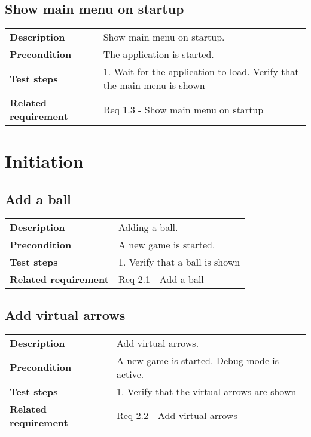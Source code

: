 \documentclass[a4paper,titlepage]{article}
\begin{document}
\subsection{Show main menu on startup}
\begin{tabularx}{\textwidth}{lX}
	\textbf{Description}	&
		Show main menu on startup.\\
	\textbf{Precondition}	&
		The application is started.\\
	\textbf{Test steps}	&
		1. Wait for the application to load\newline
		2. Verify that the main menu is shown\\
	\textbf{Related requirement}	&
		Req 1.3 - Show main menu on startup\\
\end{tabularx}

\newpage
\section{Initiation}
\subsection{Add a ball}
\begin{tabularx}{\textwidth}{lX}
	\textbf{Description}	&
		Adding a ball.\\
	\textbf{Precondition}	&
		A new game is started.\\
	\textbf{Test steps}	&
		1. Verify that a ball is shown \\
	\textbf{Related requirement}	&
		Req 2.1 - Add a ball \\
\end{tabularx}

\subsection{Add virtual arrows}
\begin{tabularx}{\textwidth}{lX}
	\textbf{Description}	&
		Add virtual arrows.\\
	\textbf{Precondition}	&
		A new game is started.\newline
		Debug mode is active.\\
	\textbf{Test steps}	&
		1. Verify that the virtual arrows are shown\\
	\textbf{Related requirement}	&
		Req 2.2 - Add virtual arrows \\
\end{tabularx}
\end{document}
